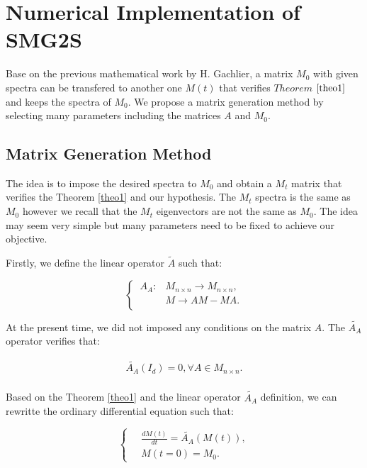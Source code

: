 \section{Numerical Implementation of SMG2S} \label{Matrix_Generation_Method}
Base on the previous mathematical work by H. Gachlier, a matrix $M_0$ with given spectra can be transfered to another one $M(t)$ that verifies $Theorem$ $\ref{theo1}$ and keeps the spectra of $M_0$. We propose a matrix generation method by selecting many parameters including the matrices $A$ and $M_0$. 

\subsection{Matrix Generation Method}

The idea is to impose the desired spectra to $M_0$ and obtain a $M_t$ matrix that verifies the Theorem \ref{theo1} and our hypothesis. The $M_t$ spectra is the same as $M_0$ however we recall that the $M_t$ eigenvectors are not the same as $M_0$. The idea may seem very simple but many parameters need to be  fixed to achieve our objective.

Firstly, we define the linear operator $\widetilde{A}$ such that:

\begin{equation}
\left\{\
\begin{aligned}
A_A: &M_{n \times n} \rightarrow M_{n \times n}, \\
&M \rightarrow  AM-MA. \\ 
\end{aligned}
\right.
\end{equation}

At the present time, we did not imposed any conditions on the matrix $A$. The $\widetilde{A_A}$
operator verifies that:

\begin{equation}
\begin{aligned}
\widetilde{A_A}(I_d)=0, \forall A \in M_{n \times n}. \\ 
\end{aligned}
\end{equation}

Based on the Theorem \ref{theo1} and the linear operator $\widetilde{A_A}$ definition, we can rewritte the
ordinary differential equation such that:

\begin{equation}
\label{eq3}
\left\{\
\begin{aligned} 
&\frac{dM(t)}{dt} =  \widetilde{A_A}(M(t)), \\ 
&M(t=0) =  M_0.
\end{aligned}
\right.
\end{equation}

